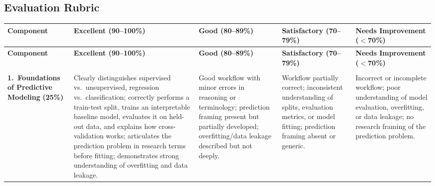 \begin{landscape}

    \section{Evaluation Rubric}

    {\footnotesize

    \begin{longtable}{%
        >{\RaggedRight\arraybackslash}p{2.5cm}   %
        >{\RaggedRight\arraybackslash}p{4.5cm}   %
        >{\RaggedRight\arraybackslash}p{4.2cm}   %
        >{\RaggedRight\arraybackslash}p{4.2cm}   %
        >{\RaggedRight\arraybackslash}p{4.5cm}}  %

    \toprule
    \textbf{Component} &
    \textbf{Excellent (90--100\%)} &
    \textbf{Good (80--89\%)} &
    \textbf{Satisfactory (70--79\%)} &
    \textbf{Needs Improvement ($<$70\%)} \\
    \midrule
    \endfirsthead

    \toprule
    \textbf{Component} &
    \textbf{Excellent (90--100\%)} &
    \textbf{Good (80--89\%)} &
    \textbf{Satisfactory (70--79\%)} &
    \textbf{Needs Improvement ($<$70\%)} \\
    \midrule
    \endhead

    \midrule
    \multicolumn{5}{r}{\textit{Continued on next page}} \\
    \endfoot

    \bottomrule
    \endlastfoot

    \textbf{1.\ Foundations of Predictive Modeling}
    \newline\textbf{(25\%)}
    &
    Clearly distinguishes supervised vs.\ unsupervised, regression
    vs.\ classification; correctly performs a train-test split, trains an
    interpretable baseline model, evaluates it on held-out data, and explains
    how cross-validation works; articulates the prediction problem in research
    terms before fitting; demonstrates strong understanding of overfitting
    and data leakage.
    &
    Good workflow with minor errors in reasoning or terminology;
    prediction framing present but partially developed;
    overfitting/data leakage described but not deeply.
    &
    Workflow partially correct; inconsistent understanding of splits,
    evaluation metrics, or model fitting; prediction framing absent
    or generic.
    &
    Incorrect or incomplete workflow; poor understanding of model evaluation,
    overfitting, or data leakage; no research framing of the prediction
    problem.
    \\
    \midrule


\end{longtable}}
\end{landscape}
